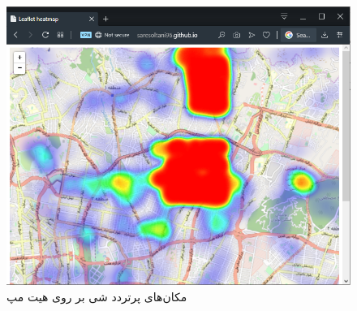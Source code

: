  \begin{figure}[!h]
	\centerline{\includegraphics[width=.8\textwidth]{heatmap}}
	\caption{مکان‌های پرتردد شی بر روی هیت مپ}
\end{figure}

